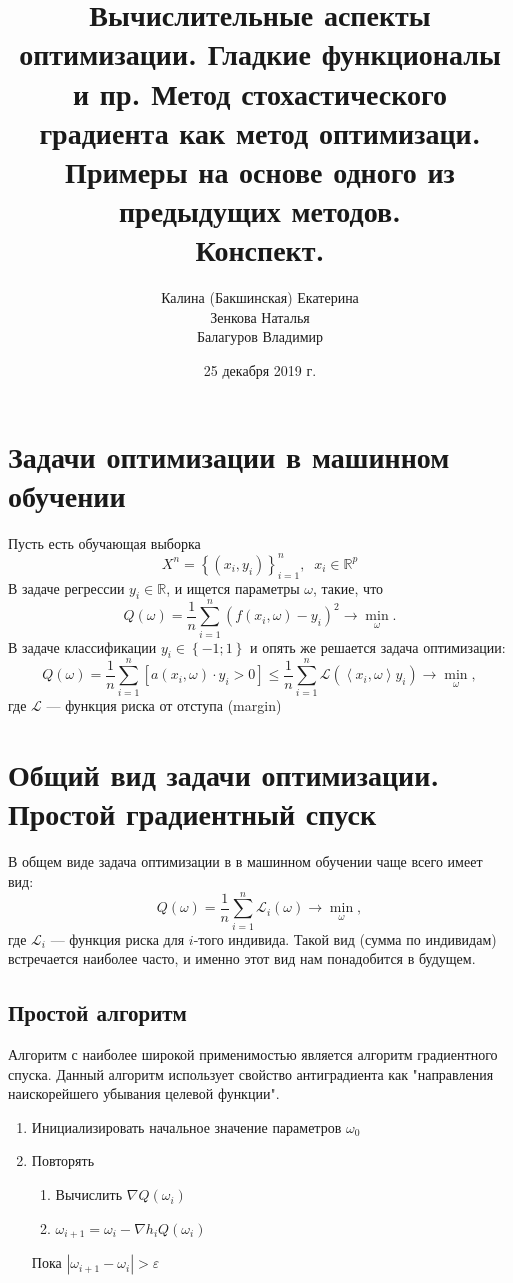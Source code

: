 \documentclass{article}
\title{Вычислительные аспекты оптимизации. Гладкие функционалы и пр. Метод стохастического градиента как метод оптимизаци. Примеры на основе одного из предыдущих методов.\\ {Конспект.}}
\author{Калина (Бакшинская) Екатерина\\
        Зенкова Наталья \\
        Балагуров Владимир }
\date{25 декабря 2019 г.}
\begin{document}
\maketitle
\tableofcontents
\newpage

\section{Задачи оптимизации в машинном обучении}
Пусть есть обучающая выборка 
$$
X^{n} = \left\{\left(x_i, y_i\right)\right\}_{i=1}^{n}, \;\; x_i \in\mathbb{R}^{p}
$$
В задаче регрессии $y_i \in \mathbb{R}$, и ищется параметры $\omega$, такие, что 
$$
Q(\omega) =\frac{1}{n} \sum\limits_{i=1}^{n}\left(f(x_i,\omega)-y_i\right)^2 \to \underset{\omega}{\min}.
$$
В задаче классификации $y_i \in \left\{-1;1\right\}$ и опять же решается задача оптимизации:
$$
Q(\omega) =\frac{1}{n} \sum\limits_{i=1}^{n}\left[a(x_i,\omega)\cdot y_i > 0\right] \leqslant \frac{1}{n}\sum\limits_{i=1}^{n} \mathcal{L}\left(\left\langle x_i,\omega \right\rangle y_i\right) \to \underset{\omega}{\min},
$$
где $\mathcal{L}$ --- функция  риска от отступа (margin)
\section{Общий вид задачи оптимизации. Простой градиентный спуск}
В общем виде задача оптимизации в в машинном обучении чаще всего имеет вид:
$$
Q(\omega) =\frac{1}{n} \sum\limits_{i=1}^{n}\mathcal{L}_i(\omega) \to \underset{\omega}{\min},
$$
где $\mathcal{L}_i$ --- функция  риска для $i$-того индивида. Такой вид (сумма по индивидам) встречается наиболее часто, и именно этот вид нам понадобится в будущем.
\subsection{Простой алгоритм}
Алгоритм с наиболее широкой применимостью является алгоритм градиентного спуска. Данный алгоритм использует свойство антиградиента как "направления наискорейшего убывания целевой функции".   
\begin{enumerate}
    \item Инициализировать начальное значение параметров $\omega_0$
    \item Повторять 
    \begin{enumerate}
        \item Вычислить $\nabla Q(\omega_i)$
        \item $\omega_{i+1} = \omega_{i} - \nabla h_i Q(\omega_i)$
    \end{enumerate}
    Пока $|\omega_{i+1} - \omega_{i}| > \varepsilon$
\end{enumerate}
\end{document}
